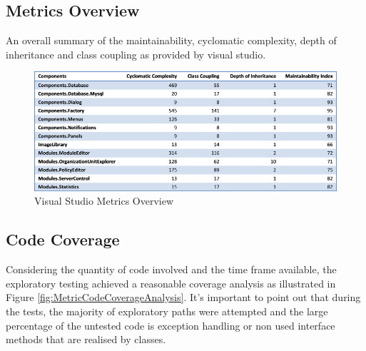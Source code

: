 

	\subsection{Metrics Overview}

		An overall summary of the maintainability, cyclomatic complexity, depth of inheritance and class coupling as provided by visual studio.
				
		\begin{figure}[h!]
		\centering
		\includegraphics[scale=0.75]{pages/chapter4/figures/4metrics.png}
		\caption{Visual Studio Metrics Overview}
		\label{fig:VisualStudioMetricsOverview}
		\end{figure}			

	\vspace{-3mm}
	\subsection{Code Coverage}

		\normalsize
		{
			Considering the quantity of code involved and the time frame available, the exploratory
			testing achieved a reasonable coverage analysis as illustrated in Figure \ref{fig:MetricCodeCoverageAnalysis}.
			It's important to point out that during the tests, the majority of exploratory paths were attempted and the large percentage
			of the untested code is exception handling or non used interface methods that are realised by classes. 		
		}

